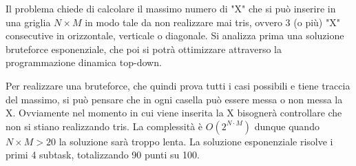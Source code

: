 
\newcommand{\tab}{\hspace{30px}}

Il problema chiede di calcolare il massimo numero di "X" che si può inserire in una griglia $N \times M$ in modo tale da non realizzare mai tris, ovvero 3 (o più) "X" consecutive in orizzontale, verticale o diagonale. Si analizza prima una soluzione bruteforce esponenziale, che poi si potrà ottimizzare attraverso la programmazione dinamica top-down.\newline

\Esponenziale

Per realizzare una bruteforce, che quindi prova tutti i casi possibili e tiene traccia del massimo, si può pensare che in ogni casella può essere messa o non messa la X. Ovviamente nel momento in cui viene inserita la X bisognerà controllare che non si stiano realizzando tris. La complessità è $O(2^{N \cdot M})$  dunque quando $N \times M > 20$ la soluzione sarà troppo lenta. La soluzione esponenziale risolve i primi 4 subtask, totalizzando 90 punti su 100. \newline

\CodiceEsp
\colorbox{white}{}

\SolDP

